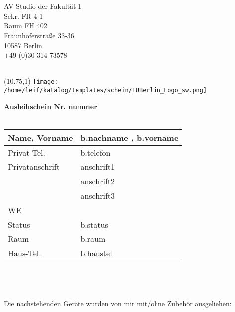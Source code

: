 \documentclass[10pt, a4paper,oneside]{article}
\begin{document}
\thispagestyle{empty}
\section*{\Large {}}
AV-Studio der Fakultät 1\\
Sekr. FR 4-1 \\
Raum FH 402 \\
Fraunhoferstraße 33-36 \\
10587 Berlin \\
+49 (0)30 314-73578\\
\\
\begin{textblock}{0.5}(10.75,1)
\texttt{[image: /home/leif/katalog/templates/schein/TUBerlin\_Logo\_sw.png]}
\end{textblock}

\noindent\textbf{Ausleihschein Nr. {{nummer}} }\\\\
\begin{tabular}{|p{3cm}|p{7cm}|}
\hline
Name, Vorname & {{ b.nachname }}, {{ b.vorname}}\\
\hline
Privat-Tel. & {{b.telefon}}\\
\hline
Privatanschrift& {{anschrift1}}\\
& {{anschrift2}}\\
& {{anschrift3}}\\
\hline
WE & \\
\hline
Status & {{b.status}}\\
\hline
Raum & {{b.raum}}\\
\hline
Haus-Tel. & {{b.haustel}}\\
\hline
\end{tabular}
\\\\\\
Die nachstehenden Geräte wurden von mir mit/ohne Zubehör ausgeliehen:
\end{document}
